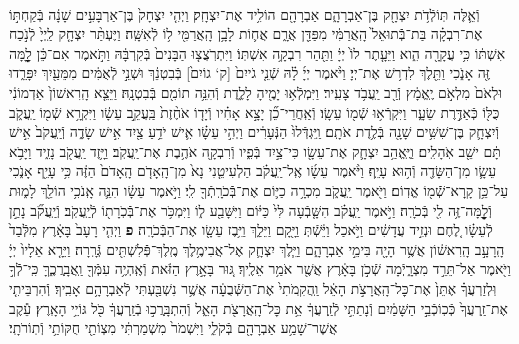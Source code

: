 \documentclass[twoside, openany, parskip=half, 11pt]{book}
\begin{document}
\begin{footnotesize}
\begin{multicols}{2}
\\
וְֿאֵ֛לֶּה תּֽוֹלְֿדֹ֥ת יִצְחָ֖ק בֶּן־אַבְרָהָ֑ם אַבְרָהָ֖ם הוֹלִ֥יד אֶת־יִצְחָֽק׃ וַיְהִ֤י יִצְחָק֙ בֶּן־אַרְבָּעִ֣ים שָׁנָ֔ה בְּֿקַחְתּ֣וֹ אֶת־רִבְקָ֗ה בַּת־בְּֿֿתוּאֵל֙ הָֽאֲרַמִּ֔י מִפַּדַּ֖ן אֲרָ֑ם אֲח֛וֹת לָבָ֥ן הָֽאֲרַמִּ֖י ל֥וֹ לְֿאִשָּֽׁה׃ וַיֶּעְתַּ֨ר יִצְחָ֤ק לַֽיְיָ֙ לְֿנֹ֣כַח אִשְׁתּ֔וֹ כִּ֥י עֲקָרָ֖ה הִ֑וא וַיֵּעָ֤תֶר לוֹ֙ יְיָ֔ וַתַּ֖הַר רִבְקָ֥ה אִשְׁתּֽוֹ׃ וַיִּתְרֹֽצֲצ֤וּ הַבָּנִים֙ בְּֿקִרְבָּ֔הּ וַתֹּ֣אמֶר אִם־כֵּ֔ן לׇׇׇׇׇׇָ֥מָּה זֶּ֖ה אָנֹ֑כִי וַתֵּ֖לֶךְ לִדְר֥שׁ אֶת־יְיָ׃  וַיֹּ֨אמֶר יְיָ֜ לָ֗הּ שְֿׁנֵ֤י גֹייִם֙ [ק‘ גוֹיִם֙] בְּֿבִטְנֵ֔ךְ וּשְׁנֵ֣י לְֿאֻמִּ֔ים מִמֵּעַ֖יִךְ יִפָּרֵ֑דוּ וּלְאֹם֙ מִלְאֹ֣ם יֶֽאֱמָ֔ץ וְֿרַ֖ב יַֽעֲבֹ֥ד צָעִֽיר׃ וַיִּמְלְֿא֥וּ יָמֶ֖יהָ לָלֶ֑דֶת וְֿהִנֵּ֥ה תוֹמִ֖ם בְּֿבִטְנָֽהּ׃ וַיֵּצֵ֤א הָֽרִאשׁוֹן֙ אַדְמוֹנִ֔י כֻּלּ֖וֹ כְּֿאַדֶּ֣רֶת שֵׂעָ֑ר וַיִּקְרְֿא֥וּ שְֿׁמ֖וֹ עֵשָֽׂו׃ וְֿאַֽחֲרֵי־כֵ֞ן יָצָ֣א אָחִ֗יו וְֿיָד֤וֹ אֹחֶ֨זֶת֙ בַּֽעֲקֵ֣ב עֵשָׂ֔ו וַיִּקְרָ֥א שְֿׁמ֖וֹ יַֽעֲקֹ֑ב וְֿיִצְחָ֛ק בֶּן־שִׁשִּׁ֥ים שָׁנָ֖ה בְּֿלֶ֥דֶת אֹתָֽם׃  וַֽיִּגְדְּֿלוּ֙ הַנְּֿעָרִ֔ים וַיְהִ֣י עֵשָׂ֗ו אִ֛ישׁ יֹדֵ֥עַ צַ֖יִד אִ֣ישׁ שָׂדֶ֑ה וְֿיַֽעֲקֹב֙ אִ֣ישׁ תָּ֔ם ישֵׁ֖ב אֹֽהָלִֽים׃ וַיֶּֽאֱהַ֥ב יִצְחָ֛ק אֶת־עֵשָׂ֖ו כִּי־צַ֣יִד בְּֿפִ֑יו וְֿרִבְקָ֖ה אֹהֶ֥בֶת אֶת־יַֽעֲקֹֽב׃ וַיָּ֥זֶד יַֽעֲקֹ֖ב נָזִ֑יד וַיָּבֹ֥א עֵשָׂ֛ו מִן־הַשָּׂדֶ֖ה וְֿה֥וּא עָיֵֽף׃ וַיֹּ֨אמֶר עֵשָׂ֜ו אֶֽל־יַֽעֲקֹ֗ב הַלְעִיטֵ֤נִי נָא֙ מִן־הָֽאָדֹ֤ם הָֽאָדֹם֙ הַזֶּ֔ה כִּ֥י עָיֵ֖ף אָנֹ֑כִי עַל־כֵּ֥ן קָֽרָא־שְֿֿׁמ֖וֹ אֱדֽוֹם׃ וַיֹּ֖אמֶר יַֽעֲקֹ֑ב מִכְרָ֥ה כַיּ֛וֹם אֶת־בְּֿֿכֹרָֽתְֿךָ֖ לִֽי׃ וַיֹּ֣אמֶר עֵשָׂ֔ו הִנֵּ֛ה אָֽנֹכִ֥י הוֹלֵ֖ךְ לָמ֑וּת וְֿלׇׇׇׇׇׇׇׇׇׇׇׇׇׇׇׇָֽמָּה־זֶּ֥ה לִ֖י בְּֿכֹרָֽה׃ וַיֹּ֣אמֶר יַֽעֲקֹ֗ב הִשָּׁ֤בְֿעָה לִּי֙ כַּיּ֔וֹם וַיִּשָּׁבַ֖ע ל֑וֹ וַיִּמְכֹּ֥ר אֶת־בְּֿֿכֹֽרָת֖וֹ לְֿיַֽעֲקֹֽב׃ וְֿיַֽעֲקֹ֞ב נָתַ֣ן לְֿעֵשָׂ֗ו לֶ֚חֶם וּנְזִ֣יד עֲדָשִׁ֔ים וַיֹּ֣אכַל וַיֵּ֔שְֿׁתְּ וַיָּ֖קָם וַיֵּלַ֑ךְ וַיִּ֥בֶז עֵשָׂ֖ו אֶת־הַבְּֿכֹרָֽה׃ \textbf{פ}
וַיְהִ֤י רָעָב֙ בָּאָ֔רֶץ מִלְּֿבַד֙ הָֽרָעָ֣ב הָֽרִאשׁ֔וֹן אֲשֶׁ֥ר הָיָ֖ה בִּימֵ֣י אַבְרָהָ֑ם וַיֵּ֧לֶךְ יִצְחָ֛ק אֶל־אֲבִימֶ֥לֶךְ מֶֽלֶךְ־פְּֿֿלִשְׁתִּ֖ים גְּֿרָֽרָה׃ וַיֵּרָ֤א אֵלָיו֙ יְיָ֔ וַיֹּ֖אמֶר אַל־תֵּרֵ֣ד מִצְרָ֑יְֿמָה שְֿׁכֹ֣ן בָּאָ֔רֶץ אֲשֶׁ֖ר אֹמַ֥ר אֵלֶֽיךָ׃ גּ֚וּר בָּאָ֣רֶץ הַזֹּ֔את וְֿאֶֽהְיֶ֥ה עִמְּֿךָ֖ וַֽאֲבָֽרֲכֶ֑ךָּ כִּֽי־לְֿֿךָ֣ וּֽלְזַרְעֲךָ֗ אֶתֵּן֙ אֶת־כׇּל־הָֽאֲרָצֹ֣ת הָאֵ֔ל וַֽהֲקִֽמֹתִי֙ אֶת־הַשְּֿׁבֻעָ֔ה אֲשֶׁ֥ר נִשְׁבַּ֖עְתִּי לְֿאַבְרָהָ֥ם אָבִֽיךָ׃ וְֿהִרְבֵּיתִ֤י אֶת־זַֽרְעֲךָ֙ כְּֿכֽוֹכְֿבֵ֣י הַשָּׁמַ֔יִם וְֿנָתַתִּ֣י לְֿזַֽרְעֲךָ֔ אֵ֥ת כׇּל־הָֽאֲרָצֹ֖ת הָאֵ֑ל וְֿהִתְבָּֽרֲכ֣וּ בְֿזַֽרְעֲךָ֔ כֹּ֖ל גּוֹיֵ֥י הָאָֽרֶץ׃ עֵ֕קֶב אֲשֶׁר־שָׁמַ֥ע אַבְרָהָ֖ם בְּֿקֹלִ֑י וַיִּשְׁמֹר֙ מִשְׁמַרְתִּ֔י מִצְוֹתַ֖י חֻקּוֹתַ֥י וְֿתֽוֹרֹתָֽי׃


\end{multicols}
\end{footnotesize}
\end{document}

